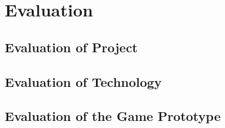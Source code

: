 \chapter{Evaluation}


\section{Evaluation of Project}


\section{Evaluation of Technology}


\section{Evaluation of the Game Prototype}
